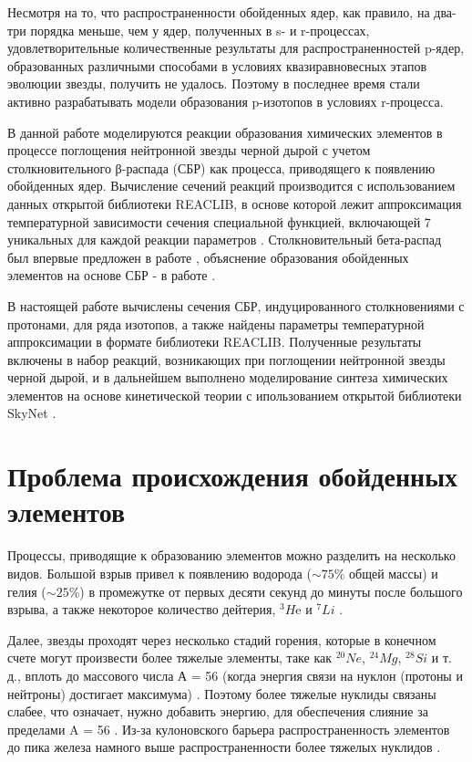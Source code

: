 \documentclass[14pt, a4paper]{article}
\begin{document}
Несмотря на то, что распространенности обойденных ядер, как правило, на два-три порядка меньше, чем у ядер, полученных в s- и r-процессах, удовлетворительные количественные результаты для распространенностей p-ядер, образованных различными способами в условиях квазиравновесных этапов эволюции звезды, получить не удалось. Поэтому в последнее время стали активно разрабатывать модели образования p-изотопов в условиях r-процесса.

В данной работе моделируются реакции образования химических элементов в процессе поглощения нейтронной звезды черной дырой \cite{bhns1} с учетом столкновительного β-распада (СБР) как процесса, приводящего к появлению обойденных ядер. Вычисление сечений реакций производится с использованием данных открытой библиотеки REACLIB, в основе которой лежит аппроксимация температурной зависимости сечения специальной функцией, включающей 7 уникальных для каждой реакции параметров \cite{jina}. Столкновительный бета-распад был впервые предложен в работе \cite{batkin}, объяснение образования обойденных элементов на основе СБР - в работе \cite{tak}.

В настоящей работе вычислены сечения СБР, индуцированного столкновениями с протонами, для ряда изотопов, а также найдены параметры температурной аппроксимации в формате библиотеки REACLIB. Полученные результаты включены в набор реакций, возникающих при поглощении нейтронной звезды черной дырой, и в дальнейшем выполнено моделирование синтеза химических элементов на основе кинетической теории с ипользованием открытой библиотеки SkyNet \cite{skynet}.


\section{Проблема происхождения обойденных элементов}

Процессы, приводящие к образованию элементов можно разделить на несколько видов. Большой взрыв привел к появлению водорода ($\sim75\%$ общей массы) и гелия ($\sim25\%$) в промежутке от первых десяти секунд до минуты после большого взрыва, а также некоторое количество дейтерия, $^3H$e и $^7Li$ \cite{Tytler}.

 Далее, звезды проходят через несколько стадий горения, которые в конечном счете могут произвести более тяжелые элементы, таке как $^{20}Ne$, $^{24}Mg$, $^{28}Si$ и т. д., вплоть до массового числа А = 56 (когда энергия связи на нуклон (протоны и нейтроны) достигает максимума) \cite{cauldrons, energy, interiors}. Поэтому более тяжелые нуклиды связаны слабее, что означает, нужно добавить энергию, для обеспечения слияние за пределами A = 56 \cite{cauldrons, qse, massive}. Из-за кулоновского барьера распространенность элементов до пика железа намного выше распространенности более тяжелых нуклидов \cite{iron-abu}.
\end{document}
